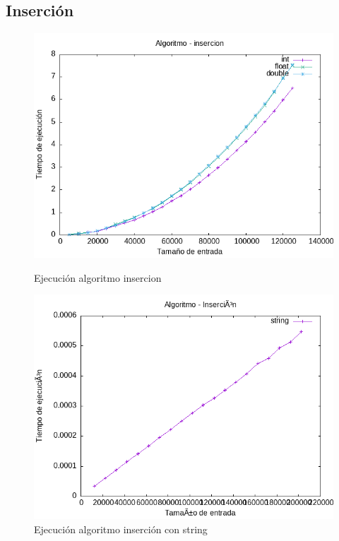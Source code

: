 \documentclass[11pt]{article}
\begin{document}
\subsection*{Inserción}
\begin{figure}[H]
    \begin{minipage}{0.5\textwidth}
        \centering
        \includegraphics[width=\linewidth]{assets/Img/insercion.png}
        \caption{Ejecución algoritmo insercion}
        \label{fig:insercion}
    \end{minipage}%
    \begin{minipage}{0.5\textwidth}
        \centering
        \includegraphics[width=\linewidth]{assets/Img/insercionstring.png}
        \caption{Ejecución algoritmo inserción con string}
        \label{fig:insercionstring}
    \end{minipage}
\end{figure}
\end{document}

